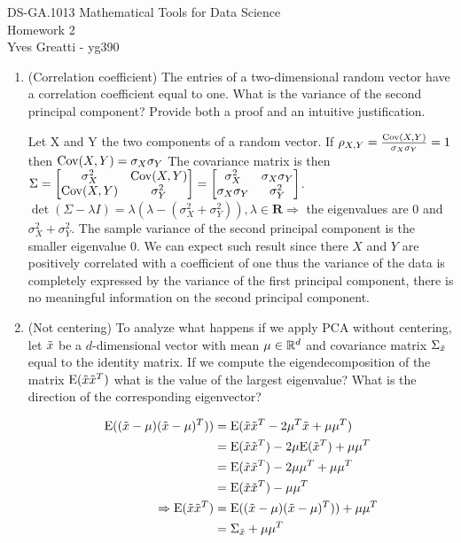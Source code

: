 \documentclass[12pt,twoside]{article}
\begin{document}
\noindent DS-GA.1013 Mathematical Tools for Data Science \\
Homework 2 \\
Yves Greatti - yg390\\

\begin{enumerate}
\item (Correlation coefficient) The entries of a two-dimensional random vector have a correlation coefficient equal to one. What is the variance of the second principal component? Provide both a proof and an intuitive justification. 

Let X and Y the two components of a random vector. If $\rho_{X,Y} = \frac {\mathrm{Cov}(X,Y)}{\sigma_X \sigma_Y} = 1$ then $\mathrm{Cov}(X,Y) = \sigma_X \sigma_Y$
The covariance matrix  is then  $ \Sigma = \begin{bmatrix} \sigma_X^2 & \mathrm{Cov}(X,Y) \\  \mathrm{Cov}(X,Y) & \sigma_Y^2  \end{bmatrix}  = \begin{bmatrix}  \sigma_X^2 &  \sigma_X \sigma_Y \\ \sigma_X \sigma_Y & \sigma_Y^2 \end{bmatrix}$.
$\det(\Sigma -\lambda I) = \lambda (\lambda - (\sigma_X^2 +  \sigma_Y^2)), \lambda \in   \mathbf{R} \Rightarrow $ the eigenvalues are $0$ and $\sigma_X^2 +  \sigma_Y^2$.
The sample variance of the second principal component is the smaller eigenvalue $0$. We can expect such result since there $X$ and $Y$ are positively correlated with a coefficient of one thus the variance of the data is completely expressed by the variance of the first principal component, there is no meaningful information on the second principal component.


\newpage
\item (Not centering) To analyze what happens if we apply PCA without centering, let $\tilde{  x }$ be a $d$-dimensional vector with mean $\mu \in \mathbb{R}^{d}$ and covariance matrix $\Sigma_{\tilde{  x }}$ equal to the identity matrix. If we compute the eigendecomposition of the matrix $\mathrm{E}(\tilde{  x } \tilde{  x }^T)$ what is the value of the largest eigenvalue? What is the direction of the corresponding eigenvector? 
  
  \begin{align*}
  	\mathrm{E}((\tilde{  x } - \mu) (\tilde{  x } - \mu)^T))		&=	\mathrm{E}(\tilde{  x } \tilde{  x }^T -2 \mu^T \tilde{  x } + \mu \mu^T) \\
								&= 	\mathrm{E}(\tilde{  x } \tilde{  x }^T) -2 \mu \mathrm{E}(\tilde{  x }^T) + \mu \mu^T \\
								&=	\mathrm{E}(\tilde{  x } \tilde{  x }^T) -2  \mu \mu^T +  \mu \mu^T \\
								&=	\mathrm{E}(\tilde{  x } \tilde{  x }^T) - \mu \mu^T \\
	\Rightarrow	\mathrm{E}(\tilde{  x } \tilde{  x }^T) 		&=	\mathrm{E}((\tilde{  x } - \mu) (\tilde{  x } - \mu)^T)	) +  \mu \mu^T \\	
								&=	\Sigma_{\tilde{  x }} +  \mu \mu^T
  \end{align*}
  

\end{enumerate}
\end{document}

